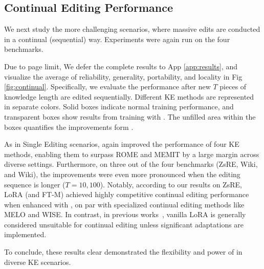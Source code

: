\subsection{Continual Editing Performance}
\label{sec:exp:continual}


We next study the more challenging scenarios, where massive edits are conducted in a continual (sequential) way.
Experiments were again run on the four benchmarks. 

Due to page limit, We defer the complete results to App \ref{app:results}, and visualize the average of reliability, generality, portability, and locality in Fig \ref{fig:continual}. 
Specifically, we evaluate the performance after new $T$ pieces of knowledge length are edited sequentially. 
Different KE methods are represented in separate colors.
Solid boxes indicate normal training performance, and transparent boxes show results from training with {\NAME}. 
The unfilled area within the boxes quantifies the improvements form {\NAME}.


As in Single Editing scenarios,
{\NAME} again improved the performance of four KE methods, 
enabling them to surpass ROME and MEMIT by a large margin across diverse settings.
Furthermore, on three out of the four benchmarks (ZsRE, Wiki, and Wiki), 
the improvements were even more pronounced when the editing sequence is longer ($T=10, 100$).
Notably, according to our results on ZsRE, 
LoRA (and FT-M) achieved highly competitive continual editing performance when enhanced with {\NAME}, 
on par with specialized continual editing methods like MELO and WISE. 
In contrast, in previous works~\citep{zhang2024comprehensive,wang2024wise}, vanilla LoRA is generally considered unsuitable for continual editing unless significant adaptations are implemented.

To conclude, these results clear demonstrated the flexibility and power of {\NAME} in diverse KE scenarios. 



